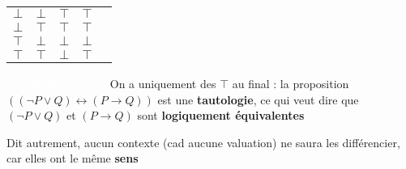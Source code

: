\begin{frame}
{\begin{tabular}{c|c||c|c|c}
$\bot$ & $\bot$ & $\top$  & $\top$ &  \\
$\bot$ & $\top$ & $\top$ & $\top$ & \\
$\top$ & $\bot$ & $\bot$ & $\bot$ & \\
$\top$ & $\top$ & $\bot$  & $\top$ &   \\
\end{tabular}}
\pause
\pause\pause\pause\pause\pause\pause
\textcolor{white}{saut de ligne discret}\newline
\pause
On a uniquement des $\top$ au final : la proposition $((\neg P \vee Q) \leftrightarrow (P \rightarrow Q))$ est une \textbf{tautologie}, ce qui veut dire que $(\neg P \vee Q)$ et $(P \rightarrow Q)$ sont \textbf{logiquement équivalentes}\pause\newline

Dit autrement, aucun contexte (cad aucune valuation) ne saura les différencier, car elles ont le même \textbf{sens}

\end{frame}



